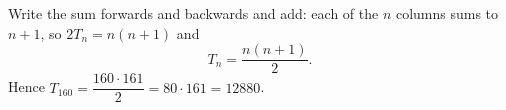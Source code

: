 Write the sum forwards and backwards and add: each of the $n$ columns sums to $n+1$, so $2T_n=n(n+1)$ and
\[
T_n=\dfrac{n(n+1)}{2}.
\]
Hence $T_{160}=\dfrac{160\cdot161}{2}=80\cdot161=\boxed{12880}$.
